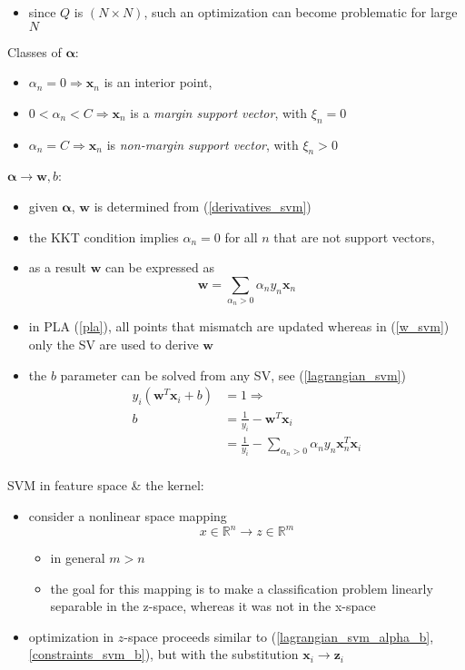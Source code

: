 \documentclass[onecolumn]{IEEEtran}
\newcommand{\beq}{\begin{equation}}
\newcommand{\eeq}{\end{equation}}
\newcommand{\bi}{\begin{itemize}}
\newcommand{\ei}{\end{itemize}}
\begin{document}
\begin{itemize}
        \item since $Q$ is $(N \times N)$, such an optimization can become problematic for large $N$
    \ei
    \item Classes of $\bm{\alpha}$:
    \bi
        \item $\alpha_n = 0 \Rightarrow \bm{x}_n$ is an interior point,
        \item $0 < \alpha_n < C \Rightarrow \bm{x}_n$ is a \emph{margin support vector}, with $\xi_n = 0$
        \item $\alpha_n = C \Rightarrow \bm{x}_n$ is \emph{non-margin support vector}, with $\xi_n > 0$
    \ei
    \item $\bm{\alpha} \rightarrow \bm{w}, b$:
    \bi
        \item given $\bm{\alpha}$,  $\bm{w}$ is determined from (\ref{derivatives_svm})
        \item the KKT condition implies $\alpha_n = 0$ for all $n$ that are not support vectors,
        \item as a result $\bm{w}$ can be expressed as
         \beq\label{w_svm}
            \bm{w} = \sum_{\alpha_n > 0} \alpha_n y_n \bm{x}_n
        \eeq
        \item in PLA (\ref{pla}), all points that mismatch are updated whereas in (\ref{w_svm}) only the SV are used to derive $\bm{w}$
        \item the $b$ parameter can be solved from any SV, see (\ref{lagrangian_svm})
        \beq\label{svm_bias}\begin{split}
            y_i (\bm{w}^T \bm{x}_i +b) &= 1 \Rightarrow\\
            b &= \frac{1}{y_i} - \bm{w}^T \bm{x}_i\\
            &= \frac{1}{y_i} - \sum_{\alpha_n >0} \alpha_n y_n \bm{x}_n^T \bm{x}_i\\
        \end{split}\eeq
    \ei
    \item SVM in feature space \& the kernel:
    \bi
        \item consider a nonlinear space mapping
        \beq
            x \in \mathbb{R}^n \rightarrow   z \in \mathbb{R}^m
        \eeq
        \bi
            \item in general $m>n$
            \item the goal for this mapping is to make a classification problem linearly separable in the z-space, whereas it was not in the x-space
        \ei
        \item optimization in $z$-space proceeds similar to (\ref{lagrangian_svm_alpha_b}, \ref{constraints_svm_b}), but with the substitution  $\bm{x}_i \rightarrow \bm{z}_i$

\end{itemize}
\end{document}
